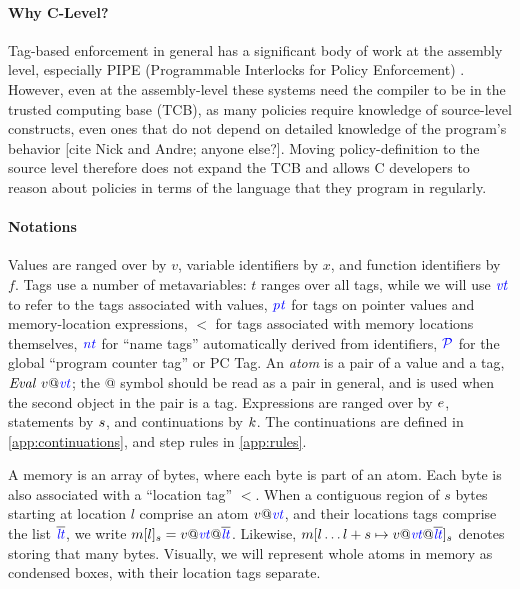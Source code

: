 \documentclass{llncs}
\begin{document}
  \paragraph*{Why C-Level?}
  Tag-based enforcement in general has a significant body of work at the assembly level, especially
  PIPE (Programmable Interlocks for Policy Enforcement) \cite{}. However, even at the assembly-level
  these systems need the compiler to be in the trusted computing base (TCB), as many policies require
  knowledge of source-level constructs, even ones that do not depend on detailed knowledge of the program's
  behavior [cite Nick and Andre; anyone else?]. Moving policy-definition to the source level therefore
  does not expand the TCB and allows C developers to reason about policies in terms of the language that
  they program in regularly.

  \paragraph*{Notations}
  Values are ranged over by \(v\), variable identifiers by \(x\), and function identifiers by \(f\).
Tags use a number of metavariables: \(t\) ranges over all tags, while we will use
\(\mathit{\color{blue} vt}\) to refer to the tags associated with values, \(\mathit{\color{blue} pt}\) for tags on pointer values
and memory-location expressions, \(\lt\) for tags associated with memory locations themselves,
\(\mathit{\color{blue} nt}\) for ``name tags'' automatically derived from identifiers, \(\mathcal{\color{blue} P}\) for the
global ``program counter tag'' or PC Tag.
An {\it atom} is a pair of a value and a tag, \(\mathit{Eval} ~ v@\mathit{\color{blue} vt}\); the @ symbol should be read
as a pair in general, and is used when the second object in the pair is a tag.
Expressions are ranged over by \(e\), statements by \(s\), and continuations by \(k\).
The continuations are defined in \cref{app:continuations}, and step rules in \cref{app:rules}.

A memory is an array of bytes, where each byte is part of an atom.
Each byte is also associated with a ``location tag'' \(\lt\). When a contiguous region of \(s\) bytes
starting at location \(l\) comprise an atom \(v@\mathit{\color{blue} vt}\), and their locations tags comprise the list \(\overline{\color{blue} \mathit{\color{blue} lt}}\),
we write \(m[l]_s = v@\mathit{\color{blue} vt} @\overline{\color{blue} \mathit{\color{blue} lt}}\). Likewise, \(m[l \dots l + s \mapsto v@\mathit{\color{blue} vt} @ \overline{\color{blue} \mathit{\color{blue} lt}}]_s\)
denotes storing that many bytes. Visually, we will represent whole atoms in memory as condensed boxes,
with their location tags separate.
\end{document}
